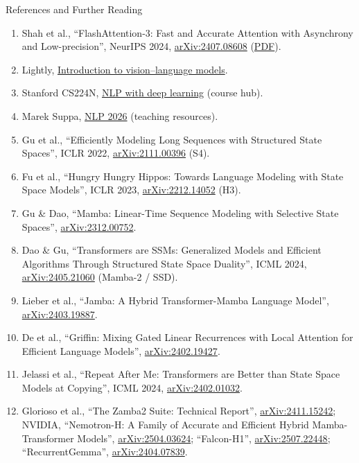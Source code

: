 \begin{frame}[allowframebreaks,t]{References and Further Reading}
\begin{enumerate}
    \item Shah et al., ``FlashAttention-3: Fast and Accurate Attention with Asynchrony and Low-precision'', NeurIPS 2024, \href{https://arxiv.org/abs/2407.08608}{arXiv:2407.08608} (\href{https://tridao.me/publications/flash3/flash3.pdf}{PDF}).
    \item Lightly, \href{https://www.lightly.ai/blog/introduction-to-vision-language-models}{Introduction to vision--language models}.
    \item Stanford CS224N, \href{https://web.stanford.edu/class/cs224n/}{NLP with deep learning} (course hub).
    \item Marek Suppa, \href{https://mareksuppa.com/teaching/nlp-2026/}{NLP 2026} (teaching resources).
    \item Gu et al., ``Efficiently Modeling Long Sequences with Structured State Spaces'', ICLR 2022, \href{https://arxiv.org/abs/2111.00396}{arXiv:2111.00396} (S4).
    \item Fu et al., ``Hungry Hungry Hippos: Towards Language Modeling with State Space Models'', ICLR 2023, \href{https://arxiv.org/abs/2212.14052}{arXiv:2212.14052} (H3).
    \item Gu \& Dao, ``Mamba: Linear-Time Sequence Modeling with Selective State Spaces'', \href{https://arxiv.org/abs/2312.00752}{arXiv:2312.00752}.
    \item Dao \& Gu, ``Transformers are SSMs: Generalized Models and Efficient Algorithms Through Structured State Space Duality'', ICML 2024, \href{https://arxiv.org/abs/2405.21060}{arXiv:2405.21060} (Mamba-2 / SSD).
    \item Lieber et al., ``Jamba: A Hybrid Transformer-Mamba Language Model'', \href{https://arxiv.org/abs/2403.19887}{arXiv:2403.19887}.
    \item De et al., ``Griffin: Mixing Gated Linear Recurrences with Local Attention for Efficient Language Models'', \href{https://arxiv.org/abs/2402.19427}{arXiv:2402.19427}.
    \item Jelassi et al., ``Repeat After Me: Transformers are Better than State Space Models at Copying'', ICML 2024, \href{https://arxiv.org/abs/2402.01032}{arXiv:2402.01032}.
    \item Glorioso et al., ``The Zamba2 Suite: Technical Report'', \href{https://arxiv.org/abs/2411.15242}{arXiv:2411.15242}; NVIDIA, ``Nemotron-H: A Family of Accurate and Efficient Hybrid Mamba-Transformer Models'', \href{https://arxiv.org/abs/2504.03624}{arXiv:2504.03624}; ``Falcon-H1'', \href{https://arxiv.org/abs/2507.22448}{arXiv:2507.22448}; ``RecurrentGemma'', \href{https://arxiv.org/abs/2404.07839}{arXiv:2404.07839}.
  \end{enumerate}
\end{frame}
